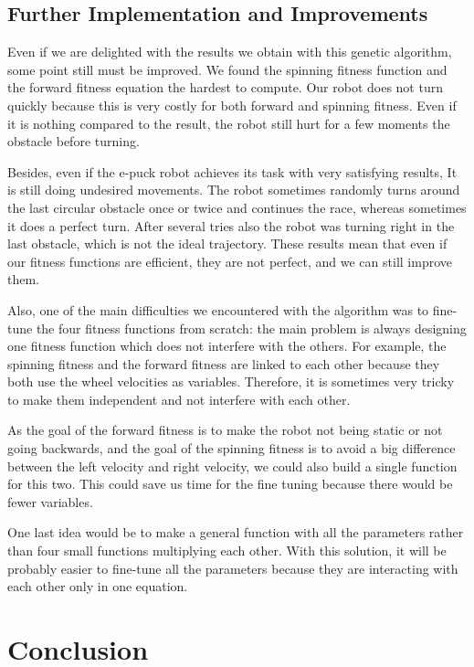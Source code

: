 \documentclass[lettersize,journal]{IEEEtran}
\begin{document}
\subsection{Further Implementation and Improvements}
Even if we are delighted with the results we obtain with this genetic algorithm, some point still must be improved. We found the spinning fitness function and the forward fitness equation the hardest to compute. Our robot does not turn quickly because this is very costly for both forward and spinning fitness. Even if it is nothing compared to the result, the robot still hurt for a few moments the obstacle before turning.
\par
Besides, even if the e-puck robot achieves its task with very satisfying results, It is still doing undesired movements. The robot sometimes randomly turns around the last circular obstacle once or twice and continues the race, whereas sometimes it does a perfect turn. After several tries also the robot was turning right in the last obstacle, which is not the ideal trajectory. These results mean that even if our fitness functions are efficient, they are not perfect, and we can still improve them.
\par
Also, one of the main difficulties we encountered with the algorithm was to fine-tune the four fitness functions from scratch: the main problem is always designing one fitness function which does not interfere with the others. For example, the spinning fitness and the forward fitness are linked to each other because they both use the wheel velocities as variables. Therefore, it is sometimes very tricky to make them independent and not interfere with each other.
\par
As the goal of the forward fitness is to make the robot not being static or not going backwards, and the goal of the spinning fitness is to avoid a big difference between the left velocity and right velocity, we could also build a single function for this two. This could save us time for the fine tuning because there would be fewer variables.
\par
One last idea would be to make a general function with all the parameters rather than four small functions multiplying each other. With this solution, it will be probably easier to fine-tune all the parameters because they are interacting with each other only in one equation.


\section{Conclusion}
\end{document}
